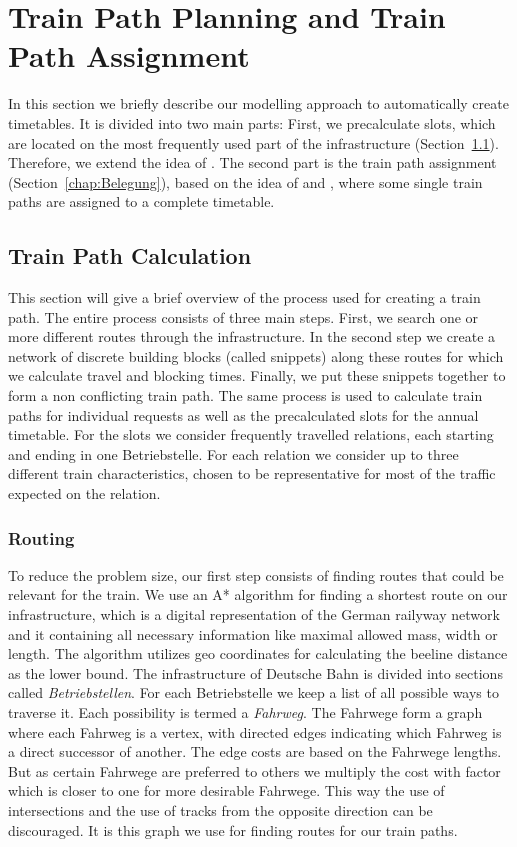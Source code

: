 \section{Train Path Planning and Train Path Assignment}
\label{chap:methods}
%
In this section we briefly describe our modelling approach to automatically create timetables. It is divided into two main parts: First, we precalculate slots, which are located on the most frequently used part of the infrastructure (Section~\ref{chap:Konstruktion}). Therefore, we extend the idea of \cite{O:2009}. The second part is the train path assignment (Section~\ref{chap:Belegung}), based on the idea of \cite{N:1998, N:2015} and \cite{NO:2014}, where some single train paths are assigned to a complete timetable.


\subsection{Train Path Calculation}
\label{chap:Konstruktion}
%
This section will give a brief overview of the process used for creating a train path. The entire process consists of three main steps. First, we search one or more different routes through the infrastructure. In the second step we create a network of discrete building blocks (called snippets) along these routes for which we calculate travel and blocking times. Finally, we put these snippets together to form a non conflicting train path. The same process is used to calculate train paths for individual requests as well as the precalculated slots for the annual timetable. For the slots we consider frequently travelled relations, each starting and ending in one Betriebstelle. For each relation we consider up to three different train characteristics, chosen to be representative for most of the traffic expected on the relation.


\subsubsection{Routing}
To reduce the problem size, our first step consists of finding routes that could be relevant for the train. We use an A* algorithm for finding a shortest route on our infrastructure, which is a digital representation of the German railyway network and it containing all necessary information like maximal allowed mass, width or length. The algorithm utilizes geo coordinates for calculating the beeline distance as the lower bound. The infrastructure of Deutsche Bahn is divided into sections called \emph{Betriebstellen}.
For each Betriebstelle we keep a list of all possible ways to traverse it. Each possibility is termed a \emph{Fahrweg}. The Fahrwege form a graph where each Fahrweg is a vertex, with directed edges indicating which Fahrweg is a direct successor of another. The edge costs are based on the Fahrwege lengths.
But as certain Fahrwege are preferred to others we multiply the cost with factor which is closer to one for more desirable Fahrwege. This way the use of intersections and the use of tracks from the opposite direction can be discouraged. It is this graph we use for finding routes for our train paths.

